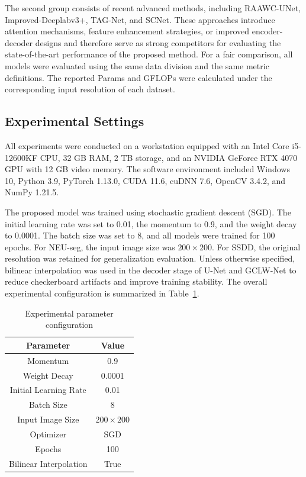 \documentclass[sn-basic]{sn-jnl}
\theoremstyle{thmstyleone}%
\theoremstyle{thmstyletwo}%
\theoremstyle{thmstylethree}%
\begin{document}
The second group consists of recent advanced methods, including RAAWC-UNet, Improved-Deeplabv3+, TAG-Net, and SCNet. These approaches introduce attention mechanisms, feature enhancement strategies, or improved encoder-decoder designs and therefore serve as strong competitors for evaluating the state-of-the-art performance of the proposed method. For a fair comparison, all models were evaluated using the same data division and the same metric definitions. The reported Params and GFLOPs were calculated under the corresponding input resolution of each dataset.

\subsection{Experimental Settings}
All experiments were conducted on a workstation equipped with an Intel Core i5-12600KF CPU, 32 GB RAM, 2 TB storage, and an NVIDIA GeForce RTX 4070 GPU with 12 GB video memory. The software environment included Windows 10, Python 3.9, PyTorch 1.13.0, CUDA 11.6, cuDNN 7.6, OpenCV 3.4.2, and NumPy 1.21.5.

The proposed model was trained using stochastic gradient descent (SGD). The initial learning rate was set to 0.01, the momentum to 0.9, and the weight decay to 0.0001. The batch size was set to 8, and all models were trained for 100 epochs. For NEU-seg, the input image size was $200\times200$. For SSDD, the original resolution was retained for generalization evaluation. Unless otherwise specified, bilinear interpolation was used in the decoder stage of U-Net and GCLW-Net to reduce checkerboard artifacts and improve training stability. The overall experimental configuration is summarized in Table~\ref{tab:parameters}.

\begin{table}[htbp]
\caption{Experimental parameter configuration}
\label{tab:parameters}
\centering
\begin{tabular}{cc}
\toprule
Parameter & Value \\
\midrule
Momentum & 0.9 \\
Weight Decay & 0.0001 \\
Initial Learning Rate & 0.01 \\
Batch Size & 8 \\
Input Image Size & $200\times200$ \\
Optimizer & SGD \\
Epochs & 100 \\
Bilinear Interpolation & True \\
\bottomrule
\end{tabular}
\end{table}
\end{document}
